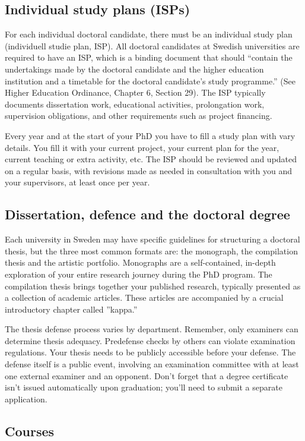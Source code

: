 \documentclass{article}
\begin{document}
\subsection{Individual study plans (ISPs)}
For each individual doctoral candidate, there must be an
individual study plan (individuell studie plan, ISP). All doctoral candidates at Swedish universities are required to have an
ISP, which is a binding document that should “contain the undertakings made by the doctoral candidate and the higher
education institution and a timetable for the doctoral candidate’s study programme.” (See Higher Education
Ordinance, Chapter 6, Section 29). The ISP typically documents dissertation work, educational activities, prolongation work, supervision obligations, and
other requirements such as project financing.

Every year and at the start of your PhD you have to fill a study plan with vary details. You fill it with your current project, your current plan for the year, current teaching or extra activity, etc. The ISP should be reviewed and updated on a regular
basis, with revisions made as needed in consultation with you and your supervisors, at least once per year.

\subsection{Dissertation, defence and the doctoral degree}
Each university in Sweden may have specific guidelines for structuring a doctoral thesis, but the three most common formats are: the monograph,
the compilation thesis and the artistic portfolio. Monographs are a self-contained, in-depth exploration of your entire research journey during the PhD program. The compilation thesis brings together your published research, typically presented as a collection of academic articles. These articles are accompanied by a crucial introductory chapter called ”kappa.”

The thesis defense process varies by department. Remember, only examiners can determine thesis adequacy. Predefense checks by others can violate
examination regulations. Your thesis needs to be publicly accessible before your defense. The defense itself is a public event, involving an examination committee with at least one external examiner and an opponent. Don’t forget that a degree certificate isn’t issued automatically upon graduation; you’ll need to submit a separate application.

\subsection{Courses}
\end{document}
